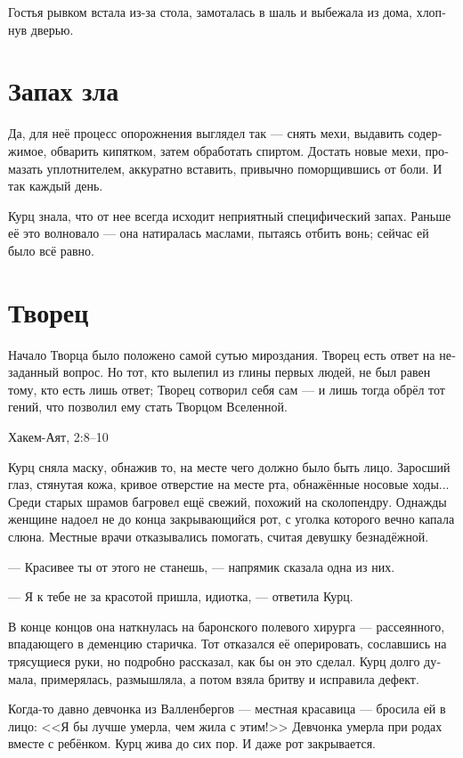 \documentclass[a4paper,10pt,fleqn]{book}\usepackage{polyglossia}\setdefaultlanguage[babelshorthands=true]{russian}\setotherlanguage{english}\defaultfontfeatures{Ligatures=TeX,Mapping=tex-text}\usepackage{xcolor}\newcommand{\ml}[3]{#2}
\begin{document}
Гостья рывком встала из-за стола, замоталась в шаль и выбежала из дома, хлопнув дверью.

\section{Запах зла}

Да, для неё процесс опорожнения выглядел так --- снять мехи, выдавить содержимое, обварить кипятком, затем обработать спиртом.
Достать новые мехи, промазать уплотнителем, аккуратно вставить, привычно поморщившись от боли.
И так каждый день.

Курц знала, что от нее всегда исходит неприятный специфический запах.
Раньше её это волновало --- она натиралась маслами, пытаясь отбить вонь;
сейчас ей было всё равно.

\section{Творец}

\epigraph{Начало Творца было положено самой сутью мироздания.
Творец есть ответ на незаданный вопрос.
Но тот, кто вылепил из глины первых людей, не был равен тому, кто есть лишь ответ;
Творец сотворил себя сам --- и лишь тогда обрёл тот гений, что позволил ему стать Творцом Вселенной.}
{Хакем-Аят, 2:8--10}

Курц сняла маску, обнажив то, на месте чего должно было быть лицо.
Заросший глаз, стянутая кожа, кривое отверстие на месте рта, обнажённые носовые ходы...
Среди старых шрамов багровел ещё свежий, похожий на сколопендру.
Однажды женщине надоел не до конца закрывающийся рот, с уголка которого вечно капала слюна.
Местные врачи отказывались помогать, считая девушку безнадёжной.

--- Красивее ты от этого не станешь, --- напрямик сказала одна из них.

--- Я к тебе не за красотой пришла, идиотка, --- ответила Курц.

В конце концов она наткнулась на баронского полевого хирурга --- рассеянного, впадающего в деменцию старичка.
Тот отказался её оперировать, сославшись на трясущиеся руки, но подробно рассказал, как бы он это сделал.
Курц долго думала, примерялась, размышляла, а потом взяла бритву и исправила дефект.

Когда-то давно девчонка из Валленбергов --- местная красавица --- бросила ей в лицо:
<<Я бы лучше умерла, чем жила с этим!>>
Девчонка умерла при родах вместе с ребёнком.
Курц жива до сих пор.
И даже рот закрывается.
\end{document}
